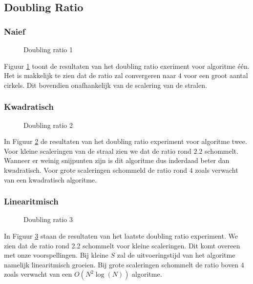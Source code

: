 \subsection{Doubling Ratio}
\subsubsection{Naief}
\begin{figure}[H]

\label{fig:doublingratio_1}
\caption{Doubling ratio 1}
\end{figure}
Figuur \ref{fig:doublingratio_1} toont de resultaten van het doubling ratio exeriment voor algoritme \'e\'en. Het is makkelijk te zien dat de ratio zal convergeren naar $4$ voor een groot aantal cirkels. Dit bovendien onafhankelijk van de scalering van de stralen.

\subsubsection{Kwadratisch}
\begin{figure}[H]

\label{fig:doublingratio_2}
\caption{Doubling ratio 2}
\end{figure}
In Figuur \ref{fig:doublingratio_2} de resultaten van het doubling ratio experiment voor algoritme twee. Voor kleine scaleringen van de straal zien we dat de ratio rond $2.2$ schommelt. Wanneer er weinig snijpunten zijn is dit algoritme dus inderdaad beter dan kwadratisch.
Voor grote scaleringen schommeld de ratio rond $4$ zoals verwacht van een kwadratisch algoritme.

\subsubsection{Linearitmisch}
\begin{figure}[h]

\label{fig:doublingratio_3}
\caption{Doubling ratio 3}
\end{figure}
In Figuur \ref{fig:doublingratio_3} staan de resultaten van het laatste doubling ratio experiment.
We zien dat de ratio rond 2.2 schommelt voor kleine scaleringen.
Dit komt overeen met onze voorspellingen.
Bij kleine $S$ zal de uitvoeringstijd van het algoritme namelijk linearitmisch groeien.
Bij grote scaleringen schommelt de ratio boven $4$ zoals verwacht van een $O(N^2\log(N))$ algoritme.

